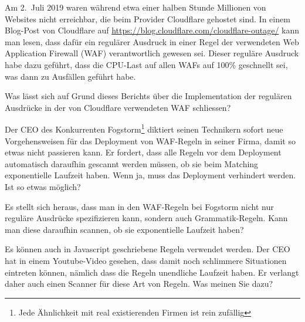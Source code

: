 Am 2.~Juli 2019 waren während etwa einer halben Stunde Millionen von
Websites nicht erreichbar, die beim Provider Cloudflare gehostet sind.
In einem Blog-Post von Cloudflare auf
\url{https://blog.cloudflare.com/cloudflare-outage/} kann man
lesen, dass dafür ein regulärer Ausdruck in einer Regel der verwendeten
Web Application Firewall (WAF) verantwortlich gewesen sei.
Dieser reguläre Ausdruck habe dazu geführt, dass die CPU-Last auf allen
WAFs auf 100\% geschnellt sei, was dann zu Ausfällen geführt habe.

\begin{teilaufgaben}
\item
Was lässt sich auf Grund dieses Berichts über die Implementation der
regulären Ausdrücke in der von Cloudflare verwendeten WAF schliessen?
\item
Der CEO des Konkurrenten Fogstorm\footnote{Jede Ähnlichkeit mit real 
existierenden Firmen ist rein zufällig} diktiert seinen Technikern
sofort neue Vorgehensweisen für das Deployment von WAF-Regeln in seiner
Firma, damit so etwas nicht passieren kann.
Er fordert, dass alle Regeln vor dem Deployment automatisch daraufhin
gescannt werden müssen, ob sie beim Matching exponentielle Laufzeit haben.
Wenn ja, muss das Deployment verhindert werden.
Ist so etwas möglich?
\item
Es stellt sich heraus, dass man in den WAF-Regeln bei Fogstorm
nicht nur reguläre Ausdrücke spezifizieren kann, sondern auch
Grammatik-Regeln.
Kann man diese daraufhin scannen, ob sie exponentielle Laufzeit haben?
\item
Es können auch in Javascript geschriebene Regeln verwendet werden.
Der CEO hat in einem Youtube-Video gesehen, dass damit noch schlimmere
Situationen eintreten können, nämlich dass die Regeln unendliche Laufzeit
haben.
Er verlangt daher auch einen Scanner für diese Art von Regeln.
Was meinen Sie dazu?
\end{teilaufgaben}

